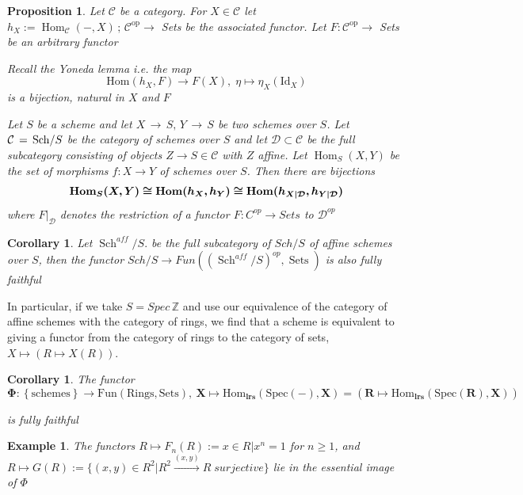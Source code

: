 \documentclass{article}
\newtheorem{corollary}[theorem]{Corollary}
\newtheorem{example}[theorem]{Example}
\newtheorem{proposition}[theorem]{Proposition}
\begin{document}
\begin{proposition}
    Let ${\mathcal{C}}$ be a category. For $X\in{\mathcal{C}}$ let $h_{X}:=\operatorname{Hom}_{\mathcal C}(-,X)\,;\,\mathcal C^{\mathrm{op}}\to$ Sets be the associated functor. Let $F\colon \mathcal C^{\mathrm{op}}\to$ Sets be an arbitrary functor
    
Recall the Yoneda lemma i.e. the map
$$
\mathrm{Hom}(h_{X},F) \rightarrow F(X),\;\eta \mapsto\eta_{X}(\mathrm{Id}_{X}) 
$$
is a bijection, natural in $X$ and $F$ 

Let $S$ be a scheme and let $X\, \to\,S,\,Y\, \to\,S$ be two schemes over $S$. Let ${\cal C}\,=\,\mathrm{Sch}/{S}$ be the category of schemes over $S$ and let ${\mathcal{D}}\subset{\mathcal{C}}$ be the full subcategory consisting of objects $Z\to S\in{\mathcal{C}}$ with $Z$ affine. Let $\operatorname{Hom}_{S}(X,Y)$ be the set of morphisms $f\colon X\to Y$ of schemes over $S$. Then there are bijections
$$
\bm{\mathrm{Hom}_{S}(X,Y)\cong\mathrm{Hom}(h_{X},h_{Y})\cong\mathrm{Hom}(h_{X\mid{\cal D}},h_{Y\mid{\cal D}})} 
$$
where $F|_{\mathcal{D}}$ denotes the restriction of a functor $F\colon C^{op} \to Sets$ to ${\mathcal{D}}^{op}$ 
\end{proposition}
\begin{corollary}
    Let $\operatorname{Sch}^{a f f} / S .$ be the full subcategory of $Sch /S$ of affine schemes over $S$, then the functor  $Sch\slash{S} \to F u n\left(\left(\operatorname{Sch}^{a f f}/S\right)^{op},\operatorname{Sets}\right)$ is also fully faithful
\end{corollary}

In particular, if we take $S = Spec\, \mathbb Z$ and use our equivalence of the category of affine schemes with the
category of rings, we find that a scheme is equivalent to giving a functor from the category of rings to
the category of sets, $X \mapsto (R \mapsto X(R))$.

\begin{corollary}
The functor
$$
\bm{\Phi\colon\left\{\mathrm{schemes}\right\} \to\mathrm{Fun}(\mathrm{Rings,Sets}),\ X\mapsto
\mathrm{Hom}_{l r s}(\mathrm{Spec}(-),X)=(R\mapsto\mathrm{Hom}_{l r s}(\mathrm{Spec}(R),X))} 
$$

is fully faithful
\end{corollary}

\begin{example}
The functors $R \mapsto F_n(R) := {x \in R | x^n = 1}$ for $n \geq 1$, and $R \mapsto G(R) := \{(x, y) \in
R^2
| R^2
\xrightarrow{(x,y)} R\; surjective\}$ lie in the essential image of $\Phi$
\end{example}
\end{document}

